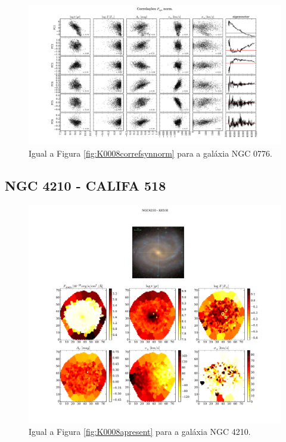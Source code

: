 \begin{figure}
    \includegraphics[width=1.3\textwidth, angle=-90]{figuras/K0073-correl-f_syn_norm-PCvsPhys.pdf}
	\caption[Correlações PCs vs. par\^ametros f\'isicos - $F_{syn}$ norm. - NGC 0001]
	{Igual a Figura \ref{fig:K0008correfsynnorm} para a galáxia NGC 0776.}
    \label{fig:K0073correfsynnorm}
\end{figure}

\subsection{NGC 4210 - CALIFA 518}

\begin{figure}
    \includegraphics[width=1.\textwidth]{figuras/K0518-apresent.pdf}
    \caption[Propriedades f\'isicas da gal\'axia NGC 4210.]
    {Igual a Figura \ref{fig:K0008apresent} para a galáxia NGC 4210.}
    \label{fig:K0518apresent}
\end{figure}

